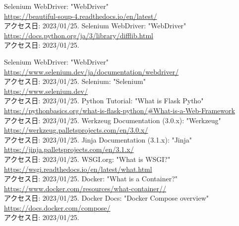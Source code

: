 \documentclass[uplatex, report, a4j, 10pt]{jsbook}
\begin{document}
\begin{thebibliography}{0}
    Selenium WebDriver: "WebDriver"\\\url{https://beautiful-soup-4.readthedocs.io/en/latest/}\\アクセス日: 2023/01/25.
    Selenium WebDriver: "WebDriver"\\\url{https://docs.python.org/ja/3/library/difflib.html}\\アクセス日: 2023/01/25.
    
    Selenium WebDriver: "WebDriver"\\\url{https://www.selenium.dev/ja/documentation/webdriver/}\\アクセス日: 2023/01/25.
    Selenium: "Selenium"\\\url{https://www.selenium.dev/}\\アクセス日: 2023/01/25. 
    Python Tutorial: "What is Flask Pytho"\\\url{https://pythonbasics.org/what-is-flask-python/#What-is-a-Web-Framework}\\アクセス日: 2023/01/25. 
    Werkzeug Documentation (3.0.x): "Werkzeug"\\\url{https://werkzeug.palletsprojects.com/en/3.0.x/}\\アクセス日: 2023/01/25. 
    Jinja Documentation (3.1.x): "Jinja"\\\url{https://jinja.palletsprojects.com/en/3.1.x/}\\アクセス日: 2023/01/25. 
    WSGI.org: "What is WSGI?"\\\url{https://wsgi.readthedocs.io/en/latest/what.html}\\アクセス日: 2023/01/25. 
    Docker: "What is a Container?"\\\url{https://www.docker.com/resources/what-container//}\\アクセス日: 2023/01/25. 
    Docker Docs: "Docker Compose overview"\\\url{https://docs.docker.com/compose/}\\アクセス日: 2023/01/25. 
    
\end{thebibliography}

\end{document}
